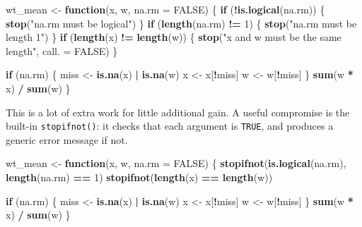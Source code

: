 \documentclass[
]{article}
\newenvironment{Shaded}{\begin{snugshade}}{\end{snugshade}}
\newcommand{\AttributeTok}[1]{\textcolor[rgb]{0.13,0.29,0.53}{#1}}
\newcommand{\ConstantTok}[1]{\textcolor[rgb]{0.56,0.35,0.01}{#1}}
\newcommand{\ControlFlowTok}[1]{\textcolor[rgb]{0.13,0.29,0.53}{\textbf{#1}}}
\newcommand{\DecValTok}[1]{\textcolor[rgb]{0.00,0.00,0.81}{#1}}
\newcommand{\FunctionTok}[1]{\textcolor[rgb]{0.13,0.29,0.53}{\textbf{#1}}}
\newcommand{\NormalTok}[1]{#1}
\newcommand{\OtherTok}[1]{\textcolor[rgb]{0.56,0.35,0.01}{#1}}
\newcommand{\SpecialCharTok}[1]{\textcolor[rgb]{0.81,0.36,0.00}{\textbf{#1}}}
\newcommand{\StringTok}[1]{\textcolor[rgb]{0.31,0.60,0.02}{#1}}
\begin{document}
\begin{Shaded}
\begin{Highlighting}[]
\NormalTok{wt\_mean }\OtherTok{\textless{}{-}} \ControlFlowTok{function}\NormalTok{(x, w, }\AttributeTok{na.rm =} \ConstantTok{FALSE}\NormalTok{) \{}
  \ControlFlowTok{if}\NormalTok{ (}\SpecialCharTok{!}\FunctionTok{is.logical}\NormalTok{(na.rm)) \{}
    \FunctionTok{stop}\NormalTok{(}\StringTok{"\textasciigrave{}na.rm\textasciigrave{} must be logical"}\NormalTok{)}
\NormalTok{  \}}
  \ControlFlowTok{if}\NormalTok{ (}\FunctionTok{length}\NormalTok{(na.rm) }\SpecialCharTok{!=} \DecValTok{1}\NormalTok{) \{}
    \FunctionTok{stop}\NormalTok{(}\StringTok{"\textasciigrave{}na.rm\textasciigrave{} must be length 1"}\NormalTok{)}
\NormalTok{  \}}
  \ControlFlowTok{if}\NormalTok{ (}\FunctionTok{length}\NormalTok{(x) }\SpecialCharTok{!=} \FunctionTok{length}\NormalTok{(w)) \{}
    \FunctionTok{stop}\NormalTok{(}\StringTok{"\textasciigrave{}x\textasciigrave{} and \textasciigrave{}w\textasciigrave{} must be the same length"}\NormalTok{, }\AttributeTok{call. =} \ConstantTok{FALSE}\NormalTok{)}
\NormalTok{  \}}
  
  \ControlFlowTok{if}\NormalTok{ (na.rm) \{}
\NormalTok{    miss }\OtherTok{\textless{}{-}} \FunctionTok{is.na}\NormalTok{(x) }\SpecialCharTok{|} \FunctionTok{is.na}\NormalTok{(w)}
\NormalTok{    x }\OtherTok{\textless{}{-}}\NormalTok{ x[}\SpecialCharTok{!}\NormalTok{miss]}
\NormalTok{    w }\OtherTok{\textless{}{-}}\NormalTok{ w[}\SpecialCharTok{!}\NormalTok{miss]}
\NormalTok{  \}}
  \FunctionTok{sum}\NormalTok{(w }\SpecialCharTok{*}\NormalTok{ x) }\SpecialCharTok{/} \FunctionTok{sum}\NormalTok{(w)}
\NormalTok{\}}
\end{Highlighting}
\end{Shaded}

This is a lot of extra work for little additional gain. A useful
compromise is the built-in \texttt{stopifnot()}: it checks that each
argument is \texttt{TRUE}, and produces a generic error message if not.

\begin{Shaded}
\begin{Highlighting}[]
\NormalTok{wt\_mean }\OtherTok{\textless{}{-}} \ControlFlowTok{function}\NormalTok{(x, w, }\AttributeTok{na.rm =} \ConstantTok{FALSE}\NormalTok{) \{}
  \FunctionTok{stopifnot}\NormalTok{(}\FunctionTok{is.logical}\NormalTok{(na.rm), }\FunctionTok{length}\NormalTok{(na.rm) }\SpecialCharTok{==} \DecValTok{1}\NormalTok{)}
  \FunctionTok{stopifnot}\NormalTok{(}\FunctionTok{length}\NormalTok{(x) }\SpecialCharTok{==} \FunctionTok{length}\NormalTok{(w))}
  
  \ControlFlowTok{if}\NormalTok{ (na.rm) \{}
\NormalTok{    miss }\OtherTok{\textless{}{-}} \FunctionTok{is.na}\NormalTok{(x) }\SpecialCharTok{|} \FunctionTok{is.na}\NormalTok{(w)}
\NormalTok{    x }\OtherTok{\textless{}{-}}\NormalTok{ x[}\SpecialCharTok{!}\NormalTok{miss]}
\NormalTok{    w }\OtherTok{\textless{}{-}}\NormalTok{ w[}\SpecialCharTok{!}\NormalTok{miss]}
\NormalTok{  \}}
  \FunctionTok{sum}\NormalTok{(w }\SpecialCharTok{*}\NormalTok{ x) }\SpecialCharTok{/} \FunctionTok{sum}\NormalTok{(w)}
\NormalTok{\}}
\end{Highlighting}
\end{Shaded}
\end{document}

